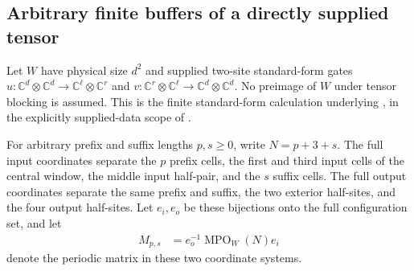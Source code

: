 \subsection{Arbitrary finite buffers of a directly supplied tensor}
\label{sec:mpu_direct_supplied_window}

Let $W$ have physical size $d^2$ and supplied two-site standard-form gates
$u:\mathbb C^d\otimes\mathbb C^d\to\mathbb C^\ell\otimes\mathbb C^r$
and $v:\mathbb C^r\otimes\mathbb C^\ell\to\mathbb C^d\otimes\mathbb C^d$.
No preimage of $W$ under tensor blocking is assumed. This is the finite
standard-form calculation underlying
\cite[equation~StandardForm, lines~603--622 and~2300--2306]{Cirac2017MPU},
in the explicitly supplied-data scope of
\cite{gap:mpu_qca_complete_block_heisenberg_scope}.

\begin{definition}
    \label{def:mpu_supplied_window_coordinates}
    \leanok
    For arbitrary prefix and suffix lengths $p,s\ge0$, write $N=p+3+s$.
    The full input coordinates separate the $p$ prefix cells, the first
    and third input cells of the central window, the middle input
    half-pair, and the $s$ suffix cells. The full output coordinates
    separate the same prefix and suffix, the two exterior half-sites,
    and the four output half-sites. Let $e_i,e_o$ be these bijections
    onto the full configuration set, and let
    \begin{align}
        M_{p,s} & =e_o^{-1}\operatorname{MPO}_W(N)e_i
        \label{eq:mpu_supplied_window_matrix}
    \end{align}
    denote the periodic matrix in these two coordinate systems.
\end{definition}

